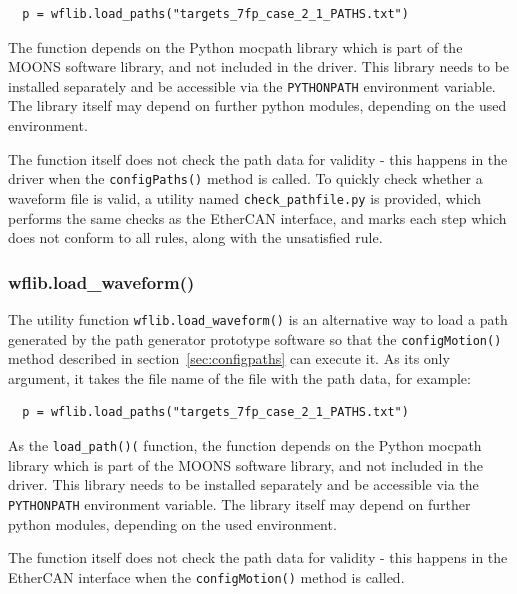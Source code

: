 \documentclass[11pt,a4paper]{scrartcl}
\begin{document}
\begin{verbatim}
  p = wflib.load_paths("targets_7fp_case_2_1_PATHS.txt")
\end{verbatim}

The function depends on the Python mocpath library which is part of
the MOONS software library, and not included in the driver.  This
library needs to be installed separately and be accessible via the
\texttt{PYTHONPATH} environment variable. The library itself may
depend on further python modules, depending on the used environment.

%

The function itself does not check the path data for validity - this
happens in the driver when the \texttt{configPaths()} method is
called. To quickly check whether a waveform file is valid, a utility
named \texttt{check\_pathfile.py} is provided, which performs the same
checks as the EtherCAN interface, and marks each step which does not conform to
all rules, along with the unsatisfied rule.


\subsubsection{wflib.load\_waveform()}
%
%
%
The utility function \texttt{wflib.load\_waveform()} is an alternative
way to load a path generated by the path generator prototype software
so that the \texttt{configMotion()} method described in
section~\ref{sec:configpaths} can execute it. As its only argument, it
takes the file name of the file with the path data, for example:

\begin{verbatim}
  p = wflib.load_paths("targets_7fp_case_2_1_PATHS.txt")
\end{verbatim}

As the \texttt{load\_path()(} function, the function depends on the
Python mocpath library which is part of the MOONS software library,
and not included in the driver.  This library needs to be installed
separately and be accessible via the \texttt{PYTHONPATH} environment
variable. The library itself may depend on further python modules,
depending on the used environment.

The function itself does not check the path data for validity - this
happens in the EtherCAN interface when the \texttt{configMotion()} method is
called.
\end{document}
